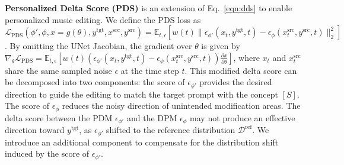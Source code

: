 \textbf{Personalized Delta Score (PDS)} is an extension of Eq.~\ref{eqn:dds} to enable personalized music editing. We define the PDS loss as $\mathcal{L}_{\text{PDS}}(\phi ', \phi, x=g(\theta) ,y^{\text{tgt}},x^{\text{src}},y^{\text{src}}) = \mathbb{E}_{t,\epsilon} [w(t)\|\epsilon_{\phi '}(x_t,y^{\text{tgt}},t) - \epsilon_{\phi}(x^{\text{src}}_t,y^{\text{src}},t) \|^2_2]$.
By omitting the UNet Jacobian, the gradient over $\theta$ is given by
$
   \nabla_\theta \mathcal{L}_{\text{PDS}} = \mathbb{E}_{t,\epsilon}[w(t)(\epsilon_{\phi '}(x_t,y^{\text{tgt}},t) -\epsilon_{\phi}(x^{\text{src}}_t,y^{\text{src}},t))\frac{\partial x}{\partial \theta}] 
$,
where $x_t$ and $x_t^{\text{src}}$ share the same sampled noise $\epsilon$ at the time step $t$.
This modified delta score can be decomposed into two components: the score of $\epsilon_{\phi '}$ provides the desired direction to guide the editing to match the target prompt with the concept $[S]$. The score of $\epsilon_{\phi}$ reduces the noisy direction of unintended modification areas.
The delta score between the PDM $\epsilon_{\phi '}$ and the DPM $\epsilon_{\phi}$ may not produce an effective direction toward $y^\text{tgt}$, as $\epsilon_{\phi '}$ shifted to the reference distribution $\mathcal{D}^{\text{ref}}$. We introduce an additional component to compensate for the distribution shift induced by the score of $\epsilon_{\phi '}$.

